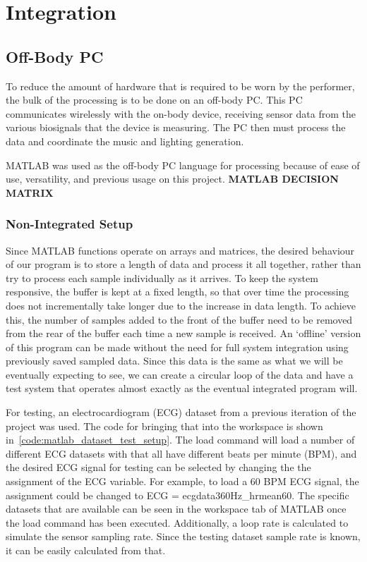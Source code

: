 \chapter{Integration}
\section{Off-Body PC}
To reduce the amount of hardware that is required to be worn by the performer,
the bulk of the processing is to be done on an off-body PC.
This PC communicates wirelessly with the on-body device,
receiving sensor data from the various biosignals that the device is measuring.
The PC then must process the data and coordinate the music and lighting generation.

MATLAB was used as the off-body PC language for processing because of ease of use, versatility,
and previous usage on this project.
\textbf{MATLAB DECISION MATRIX}

\subsection{Non-Integrated Setup}
Since MATLAB functions operate on arrays and matrices,
the desired behaviour of our program is to store a length of data and process it all together,
rather than try to process each sample individually as it arrives.
To keep the system responsive, the buffer is kept at a fixed length,
so that over time the processing does not incrementally take longer due to the increase in data length.
To achieve this, the number of samples added to the front of the buffer need to be removed from the rear of the buffer each time a new sample is received.
An `offline' version of this program can be made without the need for full system integration using previously saved sampled data.
Since this data is the same as what we will be eventually expecting to see,
we can create a circular loop of the data and have a test system that operates almost exactly as the eventual integrated program will.

For testing, an electrocardiogram (ECG) dataset from a previous iteration of the project was used.
The code for bringing that into the workspace is shown in~\autoref{code:matlab_dataset_test_setup}.
The load command will load a number of different ECG datasets with that all have different beats per minute (BPM),
and the desired ECG signal for testing can be selected by changing the the assignment of the ECG variable.
For example, to load a 60 BPM ECG signal, the assignment could be changed to ECG = ecgdata360Hz\_hrmean60.
The specific datasets that are available can be seen in the workspace tab of MATLAB once the load command has been executed.
Additionally, a loop rate is calculated to simulate the sensor sampling rate.
Since the testing dataset sample rate is known, it can be easily calculated from that.

